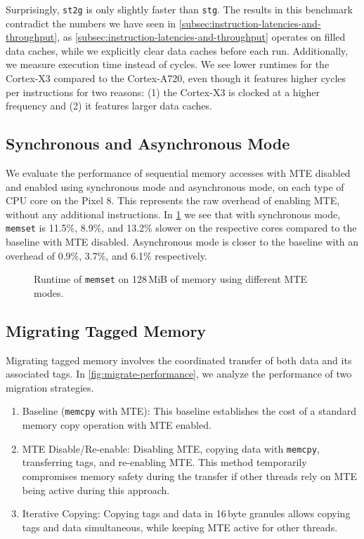 Surprisingly, \texttt{st2g} is only slightly faster than \texttt{stg}.
The results in this benchmark contradict the numbers we have seen in \cref{subsec:instruction-latencies-and-throughput}, as \cref{subsec:instruction-latencies-and-throughput} operates on filled data caches, while we explicitly clear data caches before each run.
Additionally, we measure execution time instead of cycles.
We see lower runtimes for the Cortex-X3 compared to the Cortex-A720, even though it features higher cycles per instructions for two reasons: (1) the Cortex-X3 is clocked at a higher frequency and (2) it features larger data caches.

\subsection{Synchronous and Asynchronous Mode}
\label{subsec:synchronous-and-asynchronous-mode}

We evaluate the performance of sequential memory accesses with \ac{MTE} disabled and enabled using synchronous mode and asynchronous mode, on each type of CPU core on the Pixel 8.
This represents the raw overhead of enabling \ac{MTE}, without any additional instructions.
In \cref{fig:sync-async-performance} we see that with synchronous mode, \texttt{memset} is 11.5\%, 8.9\%, and 13.2\% slower on the respective cores compared to the baseline with \ac{MTE} disabled.
Asynchronous mode is closer to the baseline with an overhead of 0.9\%, 3.7\%, and 6.1\% respectively.

\begin{figure}[h]
    \centering
    
    \caption{Runtime of \texttt{memset} on 128\,MiB of memory using different \ac{MTE} modes.}
    \label{fig:sync-async-performance}
\end{figure}

\subsection{Migrating Tagged Memory}
\label{subsec:migrating-tagged-memory}

Migrating tagged memory involves the coordinated transfer of both data and its associated tags.
In \cref{fig:migrate-performance}, we analyze the performance of two migration strategies.

\begin{enumerate}
    \item Baseline (\texttt{memcpy} with \ac{MTE}): This baseline establishes the cost of a standard memory copy operation with \ac{MTE} enabled.
    \item \ac{MTE} Disable/Re-enable: Disabling \ac{MTE}, copying data with \texttt{memcpy}, transferring tags, and re-enabling \ac{MTE}.
    This method temporarily compromises memory safety during the transfer if other threads rely on \ac{MTE} being active during this approach.
    \item Iterative Copying: Copying tags and data in 16\,byte granules allows copying tags and data simultaneous, while keeping \ac{MTE} active for other threads.
\end{enumerate}

